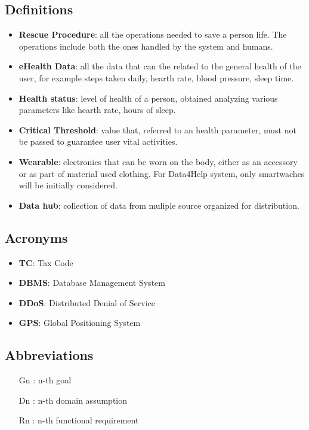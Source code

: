 \subsection{Definitions}
\begin{itemize}
\item \textbf{Rescue Procedure}: all the operations needed to save a person life. The operations include both the ones handled by the system and humans.
\item \textbf{eHealth Data}: all the data that can the related to the general health of the user, for example steps taken daily, hearth rate, blood pressure, sleep time.
\item \textbf{Health status}: level of health of a person, obtained analyzing various parameters like  hearth rate, hours of sleep.
\item \textbf{Critical Threshold}: value that, referred to an health parameter, must not be passed to guarantee user vital activities.
\item \textbf{Wearable}: electronics that can be worn on the body, either as an accessory or as part of material used clothing. For Data4Help system, only smartwaches will be initially considered.
\item \textbf{Data hub}: collection of data from muliple source organized for distribution.
\end{itemize}




\subsection{Acronyms}

\begin{itemize}
\item \textbf{TC}: Tax Code
\item \textbf{DBMS}: Database Management System
\item \textbf{DDoS}: Distributed Denial of Service
\item \textbf{GPS}: Global Positioning System
\end{itemize}

\subsection{Abbreviations}
\begin{itemize}
\item[Gn]: n-th goal
\item[Dn]: n-th domain assumption
\item[Rn]: n-th functional requirement
\end{itemize}

